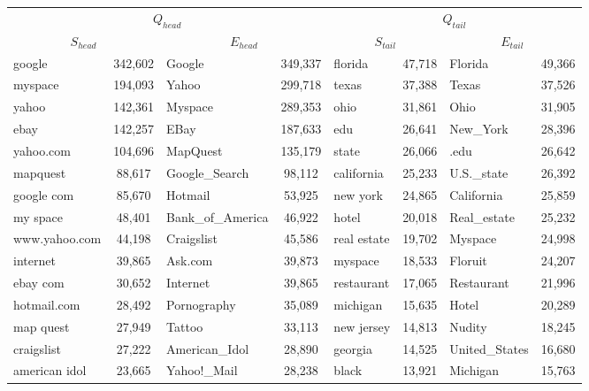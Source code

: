 \documentclass[a0,portrait,final]{a0poster}
\newcommand{\tail}[1]{$Q_{tail}${}}
\newcommand{\head}[1]{$Q_{head}${}}
\newcommand{\stail}[1]{$S_{tail}${}}
\newcommand{\shead}[1]{$S_{head}${}}
\newcommand{\etail}[1]{$E_{tail}${}}
\newcommand{\ehead}[1]{$E_{head}${}}
\begin{document}
\begin{multicols}{2}
\begin{tabular}{lc|lc|lc|lc}
\toprule
\multicolumn{4}{c}{\head{}} & \multicolumn{4}{c}{\tail{}}\\
\multicolumn{2}{c}{\shead{}} & \multicolumn{2}{c}{\ehead{}} & \multicolumn{2}{c}{\stail{}} & \multicolumn{2}{c}{\etail{}}\\
\midrule
google         & 342,602  &  Google  		   & 349,337  &  florida 	 &	47,718	&	Florida 		& 49,366 \\
myspace        & 194,093  &  Yahoo\!  		   & 299,718  &  texas  	 &	 37,388  &   Texas   		& 37,526 \\
yahoo          & 142,361  &  Myspace 		   & 289,353  &  ohio    	 &	31,861   &   Ohio    		& 31,905 \\			
ebay           & 142,257  &   EBay   		   & 187,633  &  edu     	 &	26,641   &   New\_York        & 28,396 \\
yahoo.com      & 104,696  &  MapQuest          & 135,179  &  state   	 &	26,066   &   .edu    		& 26,642 \\
mapquest       & 88,617   &  Google\_Search     & 98,112   &  california  &   25,233  &   U.S.\_state      & 26,392 \\
google com     & 85,670   &  Hotmail           & 53,925   &  new york    &   24,865  &   California      & 25,859 \\
my space       & 48,401   &	  Bank\_of\_America  & 46,922   &  hotel   	 &	20,018   &   Real\_estate     & 25,232 \\
www.yahoo.com  & 44,198   &  Craigslist        & 45,586   &  real estate &   19,702  &   Myspace 		& 24,998 \\
internet       & 39,865   &  Ask.com           & 39,873   &  myspace 	 &	18,533   &   Floruit 		& 24,207 \\
ebay com       & 30,652   &  Internet          & 39,865   &  restaurant  &  17,065   &   Restaurant      & 21,996 \\
hotmail.com    & 28,492   &  Pornography       & 35,089   &  michigan    &   15,635  &   Hotel   		& 20,289 \\
map quest      & 27,949   &  Tattoo            & 33,113   &  new jersey  &   14,813  &   Nudity  		& 18,245 \\
craigslist     & 27,222   &  American\_Idol     & 28,890   &  georgia 	 &	14,525   &   United\_States   & 16,680 \\
american idol  & 23,665   &  Yahoo!\_Mail       & 28,238   &  black   	 &	13,921   &   Michigan        & 15,763 \\
\bottomrule
\end{tabular}





\end{multicols}
\end{document}
